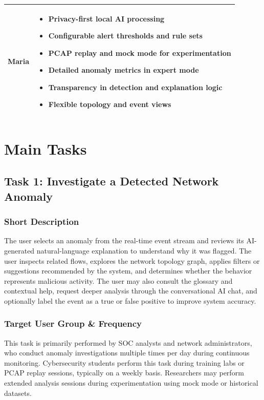 \documentclass[
    11pt, 
    a4paper, 
    parskip=half, 
    headsepline,       %
    DIV=12             %
]{scrartcl}
\begin{document}
\begin{table}[h]
\begin{tabularx}{\linewidth}{lX}
        \textbf{Maria} & 
        \vspace{-0.8em}
        \begin{itemize}[leftmargin=1em, nosep]
            \item Privacy-first local AI processing
            \item Configurable alert thresholds and rule sets
            \item PCAP replay and mock mode for experimentation
            \item Detailed anomaly metrics in expert mode
            \item Transparency in detection and explanation logic
            \item Flexible topology and event views
        \end{itemize}
        \vspace{0.3em}
        \\
        \bottomrule
    \end{tabularx}
\end{table}

\section{Main Tasks}

\subsection{Task 1: Investigate a Detected Network Anomaly}

\subsubsection*{Short Description}
The user selects an anomaly from the real-time event stream and reviews its AI-generated natural-language explanation to understand why it was flagged. The user inspects related flows, explores the network topology graph, applies filters or suggestions recommended by the system, and determines whether the behavior represents malicious activity. The user may also consult the glossary and contextual help, request deeper analysis through the conversational AI chat, and optionally label the event as a true or false positive to improve system accuracy.

\subsubsection*{Target User Group \& Frequency}
This task is primarily performed by SOC analysts and network administrators, who conduct anomaly investigations multiple times per day during continuous monitoring. Cybersecurity students perform this task during training labs or PCAP replay sessions, typically on a weekly basis. Researchers may perform extended analysis sessions during experimentation using mock mode or historical datasets.
\end{document}
